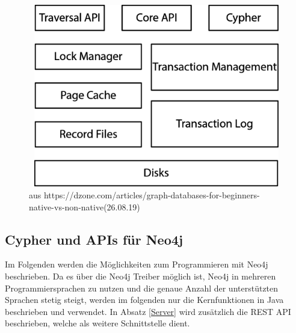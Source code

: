 \begin{figure}[H]
	\centering
	\includegraphics [width=12cm, height=8cm]{Figures/architecture}
	\caption[Architecture]{ aus https://dzone.com/articles/graph-databases-for-beginners-native-vs-non-native(26.08.19)}
	\label{fig:Architecure}
\end{figure}

\subsection{Cypher und APIs für Neo4j}
Im Folgenden werden die Möglichkeiten zum Programmieren mit Neo4j beschrieben. Da es über die Neo4j Treiber möglich ist, Neo4j in mehreren Programmiersprachen zu nutzen und die genaue Anzahl der unterstützten Sprachen stetig steigt, werden im folgenden nur die Kernfunktionen in Java beschrieben und verwendet. In Absatz \ref{Server} wird zusätzlich die REST API beschrieben, welche als weitere Schnittstelle dient.


